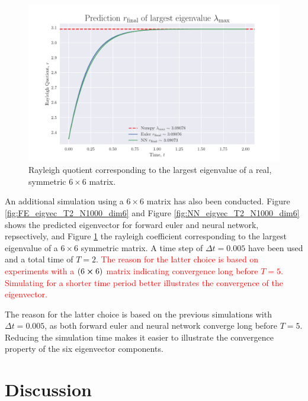 \documentclass[12pt]{extarticle}
\begin{document}
\begin{figure}[h]
	\centering
	\includegraphics[scale=0.6]{../output/plots/eigval_T2_N1000_dim6.pdf}
	\caption{Rayleigh quotient corresponding to the largest eigenvalue of a real, symmetric $6\times 6$ matrix.}
	\label{fig:eigval_T2_N1000_dim6}
\end{figure}

An additional simulation using a $6\times 6$ matrix has also been conducted. Figure \ref{fig:FE_eigvec_T2_N1000_dim6} and Figure \ref{fig:NN_eigvec_T2_N1000_dim6} shows the predicted eigenvector for forward euler and neural network, repsectively, and Figure \ref{fig:eigval_T2_N1000_dim6} the rayleigh coefficient corresponding to the largest eigenvalue of a $6\times 6$ symmetric matrix. A time step of $\Delta t = 0.005$ have been used and a total time of $T=2$. \textcolor{red}{The reason for the latter choice is based on experiments with a $(6 \cross 6)$ matrix indicating convergence long before $T=5$. Simulating for a shorter time period better illustrates the convergence of the eigenvector.}

The reason for the latter choice is based on the previous simulations with $\Delta t=0.005$, as both forward euler and neural network converge long before $T=5$. Reducing the simulation time makes it easier to illustrate the convergence property of the six eigenvector components.
 
 
\clearpage
\section{Discussion}
\end{document}

